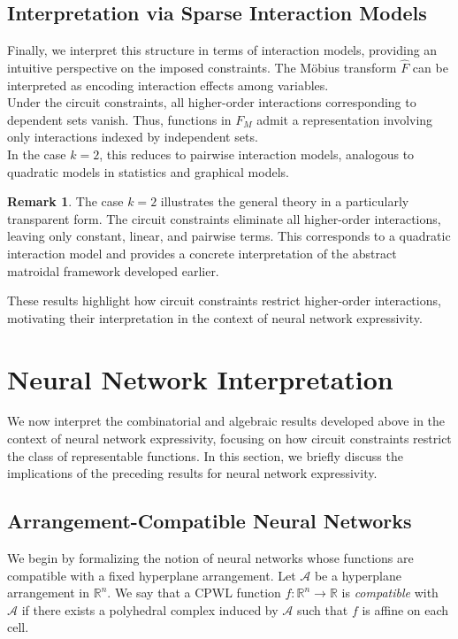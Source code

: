 \documentclass{amsart}
\theoremstyle{definition}
\newtheorem{remark}[theorem]{Remark}
\begin{document}
\subsection{Interpretation via Sparse Interaction Models}
Finally, we interpret this structure in terms of interaction models, providing an intuitive perspective on the imposed constraints.
The M\"obius transform $\widehat{F}$ can be interpreted as encoding interaction effects among variables.\\
\noindent
Under the circuit constraints, all higher-order interactions corresponding to dependent sets vanish. Thus, functions in $F_M$ admit a representation involving only interactions indexed by independent sets.\\
\noindent
In the case $k=2$, this reduces to pairwise interaction models, analogous to quadratic models in statistics and graphical models.
\begin{remark}
The case $k=2$ illustrates the general theory in a particularly transparent form.
The circuit constraints eliminate all higher-order interactions, leaving only constant,
linear, and pairwise terms. This corresponds to a quadratic interaction model and
provides a concrete interpretation of the abstract matroidal framework developed earlier.
\end{remark}
\noindent
These results highlight how circuit constraints restrict higher-order interactions, motivating their interpretation in the context of neural network expressivity.

\section{Neural Network Interpretation}\label{sec:neural}
We now interpret the combinatorial and algebraic results developed above in the context of neural network expressivity, focusing on how circuit constraints restrict the class of representable functions.
In this section, we briefly discuss the implications of the preceding results for neural network expressivity.

\subsection{Arrangement-Compatible Neural Networks}
We begin by formalizing the notion of neural networks whose functions are compatible with a fixed hyperplane arrangement.
Let $\mathcal{A}$ be a hyperplane arrangement in $\mathbb{R}^n$. We say that a CPWL function $f : \mathbb{R}^n \to \mathbb{R}$ is \emph{compatible} with $\mathcal{A}$ if there exists a polyhedral complex induced by $\mathcal{A}$ such that $f$ is affine on each cell.
\end{document}
